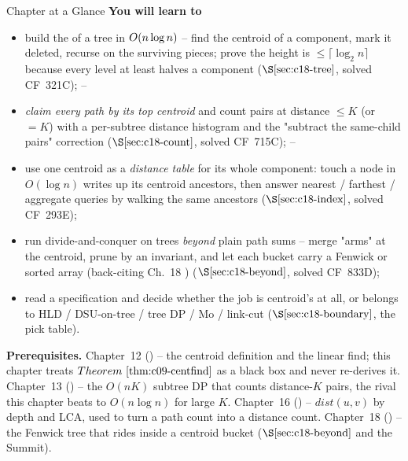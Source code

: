 \begin{chaptertheorybox}{Chapter at a Glance}
\textbf{You will learn to}
\begin{itemize}[nosep]
  \item build the  of a tree in \(O(n\log n)\) -- find the
        centroid of a component, mark it deleted, recurse on the surviving
        pieces; prove the height is \(\le\lceil\log_2 n\rceil\) because every level
        at least halves a component (\(\secref{c18-tree}\), solved CF~321C); \hfill{}--
  \item \emph{claim every path by its top centroid} and count pairs at distance
        \(\le K\) (or \(=K\)) with a per-subtree distance histogram and the
        "subtract the same-child pairs" correction (\(\secref{c18-count}\),
        solved CF~715C); \hfill{}--
  \item use one centroid as a \emph{distance table} for its whole component: touch
        a node in \(O(\log n)\) writes up its centroid ancestors, then answer
        nearest / farthest / aggregate queries by walking the same ancestors
        (\(\secref{c18-index}\), solved CF~293E); \hfill{}
  \item run divide-and-conquer on trees \emph{beyond} plain path sums -- merge
        "arms" at the centroid, prune by an invariant, and let each bucket carry a
        Fenwick or sorted array (back-citing Ch.~18 )
        (\(\secref{c18-beyond}\), solved CF~833D); \hfill{}
  \item read a specification and decide whether the job is centroid's at all, or
        belongs to HLD / DSU-on-tree / tree DP / Mo / link-cut
        (\(\secref{c18-boundary}\), the pick table). \hfill{}
\end{itemize}

\textbf{Prerequisites.} Chapter~12 () -- the centroid definition and the
linear find; this chapter treats \(\thmref{c09-centfind}\) as a black box and never
re-derives it.  Chapter~13 () -- the \(O(nK)\) subtree DP that counts
distance-\(K\) pairs, the rival this chapter beats to \(O(n\log n)\) for large
\(K\).  Chapter~16 () -- \(dist(u,v)\) by depth and LCA, used to turn a
path count into a distance count.  Chapter~18 () -- the Fenwick tree
that rides inside a centroid bucket (\(\secref{c18-beyond}\) and the Summit).
\end{chaptertheorybox}

